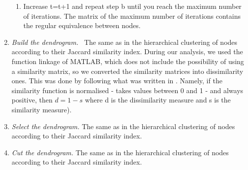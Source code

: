 \begin{enumerate}
\begin{enumerate}
            \item Increase t=t+1 and repeat step b until you reach the maximum number of iterations. The matrix of the maximum number of iterations contains the regular equivalence between nodes.

          \end{enumerate}

  \item \emph{Build the dendrogram.} \smallskip \
  The same as in the hierarchical clustering of nodes according to their Jaccard similarity index. During our analysis, we used the function linkage of MATLAB, which does not include the possibility of using a similarity matrix, so we converted the similarity matrices into dissimilarity ones. This was done by following what was written in \citet{VonLuxburg2004}. Namely, if the similarity function is normalised - takes values between 0 and 1 - and always positive, then $d=1-s$ where d is the dissimilarity measure and s is the similarity measure).

  \item \emph{Select the dendrogram.} \smallskip \newline
  The same as in the hierarchical clustering of nodes according to their Jaccard similarity index.

  \item \emph{Cut the dendrogram.} \smallskip \newline
  The same as in the hierarchical clustering of nodes according to their Jaccard similarity index.

\end{enumerate}
